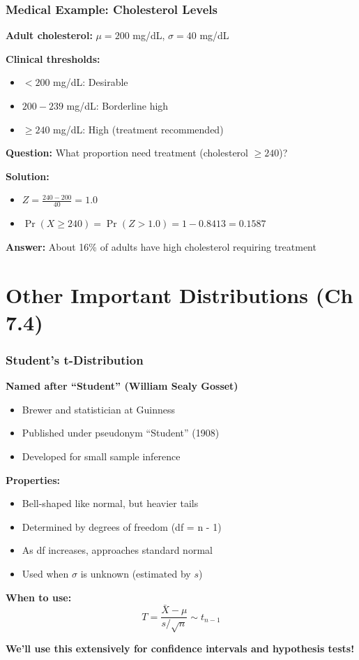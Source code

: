 \documentclass{beamer}
\begin{document}
\begin{frame}
\frametitle{Medical Example: Cholesterol Levels}
\textbf{Adult cholesterol:} $\mu = 200$ mg/dL, $\sigma = 40$ mg/dL

\vspace{0.5cm}
\textbf{Clinical thresholds:}
\begin{itemize}
\item $< 200$ mg/dL: Desirable
\item $200-239$ mg/dL: Borderline high
\item $\geq 240$ mg/dL: High (treatment recommended)
\end{itemize}

\vspace{0.5cm}
\textbf{Question:} What proportion need treatment (cholesterol $\geq 240$)?

\vspace{0.3cm}
\textbf{Solution:}
\begin{itemize}
\item $Z = \frac{240 - 200}{40} = 1.0$
\item $\Pr(X \geq 240) = \Pr(Z > 1.0) = 1 - 0.8413 = 0.1587$
\end{itemize}

\vspace{0.3cm}
\textbf{Answer:} About 16\% of adults have high cholesterol requiring treatment
\end{frame}

\section{Other Important Distributions (Ch 7.4)}

\begin{frame}
\frametitle{Student's t-Distribution}
\textbf{Named after ``Student'' (William Sealy Gosset)}
\begin{itemize}
\item Brewer and statistician at Guinness
\item Published under pseudonym ``Student'' (1908)
\item Developed for small sample inference
\end{itemize}

\vspace{0.5cm}
\textbf{Properties:}
\begin{itemize}
\item Bell-shaped like normal, but heavier tails
\item Determined by degrees of freedom (df = n - 1)
\item As df increases, approaches standard normal
\item Used when $\sigma$ is unknown (estimated by $s$)
\end{itemize}

\vspace{0.5cm}
\textbf{When to use:}
$$T = \frac{\bar{X} - \mu}{s/\sqrt{n}} \sim t_{n-1}$$

\textbf{We'll use this extensively for confidence intervals and hypothesis tests!}
\end{frame}
\end{document}
